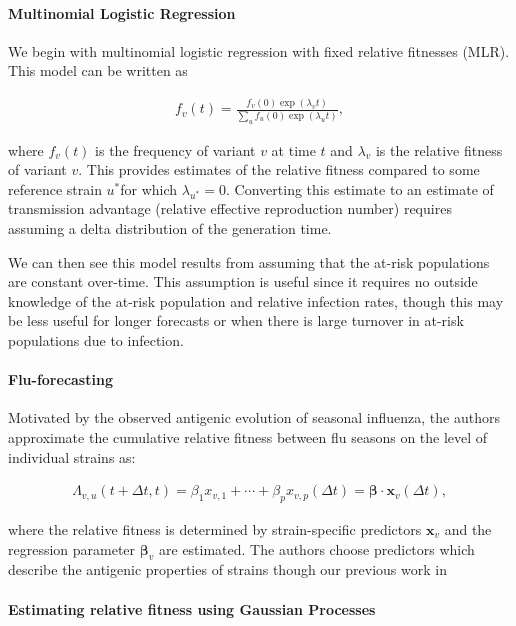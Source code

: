 \documentclass[12pt,oneside,letterpaper]{article}
\renewcommand{\vec}[1]{\boldsymbol{#1}}
\begin{document}
\paragraph{Multinomial Logistic Regression}%

We begin with multinomial logistic regression with fixed relative fitnesses (MLR).
This model can be written as

\begin{align*}
    f_{v}(t) = \frac{f_{v}(0) \exp(\lambda_{v} t)}{\sum_{u} f_{u}(0) \exp(\lambda_{u} t)},
\end{align*}

where $f_{v}(t)$ is the frequency of variant $v$ at time $t$ and $\lambda_{v}$ is the relative fitness of variant $v$.
This provides estimates of the relative fitness compared to some reference strain $u^{*}$for which $\lambda_{u^*} = 0$.
Converting this estimate to an estimate of transmission advantage (relative effective reproduction number) requires assuming a delta distribution of the generation time. \cite{Wallinga2006}

We can then see this model results from assuming that the at-risk populations are constant over-time.
This assumption is useful since it requires no outside knowledge of the at-risk population and relative infection rates, though this may be less useful for longer forecasts or when there is large turnover in at-risk populations due to infection.

\paragraph{Flu-forecasting}%

Motivated by the observed antigenic evolution of seasonal influenza, the authors approximate the cumulative relative fitness between flu seasons on the level of individual strains as:

\begin{align*}
    \Lambda_{v,u}(t + \Delta t,t) = \beta_{1} x_{v,1} + \cdots + \beta_{p} x_{v, p} (\Delta t) = \vec{\beta} \cdot \vec{x}_{v} (\Delta t),
\end{align*}

where the relative fitness is determined by strain-specific predictors $\vec{x}_{v}$ and the regression parameter $\vec{\beta}_{v}$ are estimated.
The authors choose predictors which describe the antigenic properties of strains though our previous work in 

\paragraph{Estimating relative fitness using Gaussian Processes}%
\end{document}
